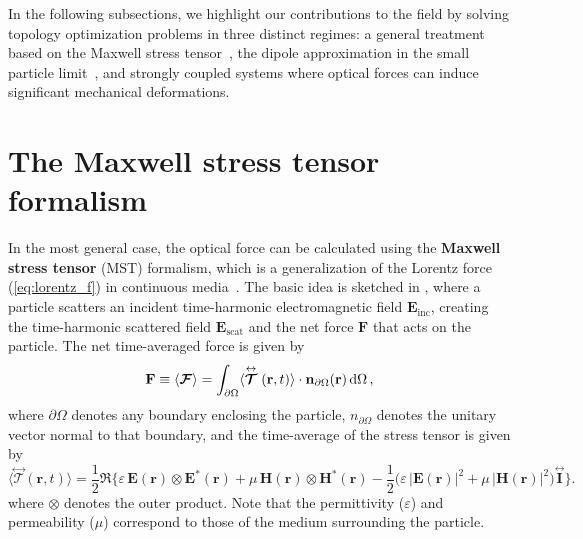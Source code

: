  In the following subsections, we highlight our contributions to the field by solving topology optimization problems in three distinct regimes: a general treatment based on the Maxwell stress tensor~\cite{ownpub2}, 
 the dipole approximation in the small particle limit~\cite{ownpub1, ownpub3}, and strongly coupled systems where optical forces can induce significant mechanical deformations.
\section{The Maxwell stress tensor formalism~\cite{ownpub2}}\label{sec:engi}

In the most general case, the optical force can be calculated using the \textbf{Maxwell stress tensor} (MST) formalism, which is a generalization of the Lorentz force (\eqref{eq:lorentz_f}) in continuous media~\cite{novotny}.
The basic idea is sketched in , where
a particle scatters an incident time-harmonic electromagnetic field $\mathbf{E}_\text{inc}$, creating the time-harmonic scattered field $\mathbf{E}_\text{scat}$ and the net force $\mathbf{F}$ that acts
on the particle. The net time-averaged force is given by~\cite{novotny}
\begin{equation}\label{eq:f_MST}
    \mathbf{F} \equiv \langle\bm{\mathcal{F}}\rangle=\int_{\partial \Omega}\langle\stackrel{\leftrightarrow}{\bm{\mathcal{T}}}(\mathbf{r}, t)\rangle \cdot \mathbf{n}_{\partial \Omega}(\mathbf{r}) \mathop{}\!\text{d} \Omega\,,
\end{equation}
where $\partial \Omega$ denotes any boundary enclosing the particle, $n_{\partial \Omega}$ denotes the unitary vector normal to that boundary, and
the time-average of the stress tensor is given by
\begin{equation}
        \langle \stackrel{\leftrightarrow}{\bm{\mathcal{T}}}(\mathbf{r}, t) \rangle 
        = \frac{1}{2} \Re \Big\{ 
            \varepsilon\, \mathbf{E}(\mathbf{r}) \otimes \mathbf{E}^*(\mathbf{r})
            + \mu\, \mathbf{H}(\mathbf{r}) \otimes \mathbf{H}^*(\mathbf{r})
         - \frac{1}{2} \big( \varepsilon\, |\mathbf{E}(\mathbf{r})|^2 + \mu\, |\mathbf{H}(\mathbf{r})|^2 \big) 
        \stackrel{\leftrightarrow}{\mathbf{I}} \Big\}.
\end{equation}
where $\otimes$ denotes the outer product. Note that the permittivity ($\varepsilon$) and permeability ($\mu$) correspond to those of the medium surrounding the particle.

